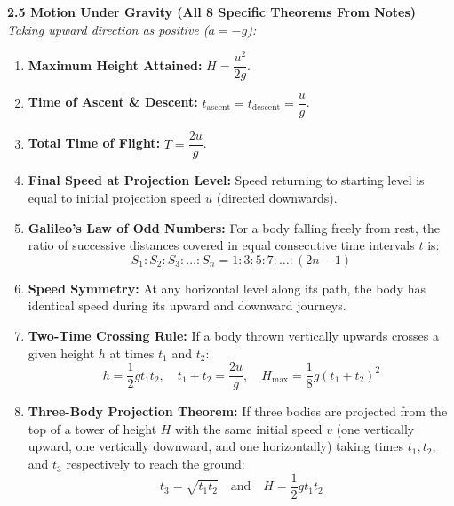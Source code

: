 \documentclass[11pt,a4paper]{article}
\begin{document}
\begin{tcolorbox}[formulacard]
  \textbf{\textcolor{l3Crimson}{2.5 Motion Under Gravity (All 8 Specific Theorems From Notes)}}
  \textit{Taking upward direction as positive ($a = -g$):}
  \begin{enumerate}[label=(\roman*),leftmargin=14pt,itemsep=2pt]
    \item \textbf{Maximum Height Attained:} $H = \dfrac{u^2}{2g}$.
    \item \textbf{Time of Ascent \& Descent:} $t_{\text{ascent}} = t_{\text{descent}} = \dfrac{u}{g}$.
    \item \textbf{Total Time of Flight:} $T = \dfrac{2u}{g}$.
    \item \textbf{Final Speed at Projection Level:} Speed returning to starting level is equal to initial projection speed $u$ (directed downwards).
    \item \textbf{Galileo's Law of Odd Numbers:} For a body falling freely from rest, the ratio of successive distances covered in equal consecutive time intervals $t$ is:
    \[
      S_1 : S_2 : S_3 : \dots : S_n = 1 : 3 : 5 : 7 : \dots : (2n - 1)
    \]
    \item \textbf{Speed Symmetry:} At any horizontal level along its path, the body has identical speed during its upward and downward journeys.
    \item \textbf{Two-Time Crossing Rule:} If a body thrown vertically upwards crosses a given height $h$ at times $t_1$ and $t_2$:
    \[
      h = \frac{1}{2}g t_1 t_2, \quad t_1 + t_2 = \frac{2u}{g}, \quad H_{\max} = \frac{1}{8}g (t_1 + t_2)^2
    \]
    \item \textbf{Three-Body Projection Theorem:} If three bodies are projected from the top of a tower of height $H$ with the same initial speed $v$ (one vertically upward, one vertically downward, and one horizontally) taking times $t_1, t_2$, and $t_3$ respectively to reach the ground:
    \[
      t_3 = \sqrt{t_1 t_2} \quad \text{and} \quad H = \frac{1}{2}g t_1 t_2
    \]
  \end{enumerate}
\end{tcolorbox}

\vspace{5pt}
\noindent{\large\textbf{\textsf{\textcolor{primaryDark}{2.6 Complete Graph Masterclass (From Notes)}}}}\\[3pt]
\end{document}
